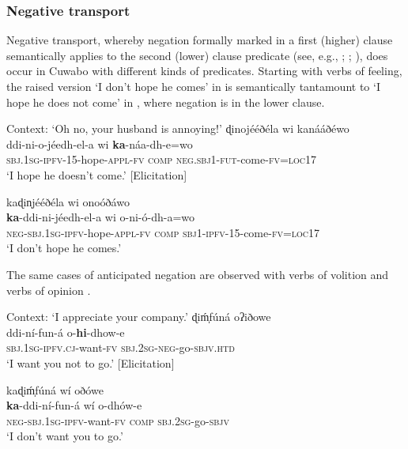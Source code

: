 \documentclass[output=paper,colorlinks=true, citecolor=brown,draftmode]{langscibook}
\begin{document}
\subsubsection{Negative transport}\label{sec:cuw:4.6.1}
Negative transport, whereby negation formally marked in a first (higher) clause semantically applies to the second (lower) clause predicate (see, e.g., \citealt{Lakoff1969}; \citealt{Lindholm1969}; \citealt{Horn1989}), does occur in Cuwabo with different kinds of predicates. Starting with verbs of feeling, the raised version ‘I don’t hope he comes’ in  is semantically tantamount to ‘I hope he does not come’ in , where negation is in the lower clause.

\ea\label{ex:cuw:81}
    Context:  ‘Oh no, your husband is annoying!’ %
    \ea\label{ex:cuw:81a} ɖinojééðéla wi kanááðéwo\\ 
        \gll  ddi-ni-o-jéedh-el-a wi \textbf{ka}{}-náa-dh-e=wo \\
               \textsc{sbj.1sg-ipfv-15}{}-hope-\textsc{appl-fv} \textsc{comp} \textsc{neg.sbj1-fut-}come-\textsc{fv=loc17} \\
        \glt  ‘I hope he doesn’t come.’ [Elicitation]

    \ex\label{ex:cuw:81b} kaɖin̩jééðéla wi onoóðáwo \\
        \gll  \textbf{ka}{}-ddi-ni-jéedh-el-a wi o-ni-ó-dh-a=wo \\
             \textsc{neg-sbj.1sg-ipfv-}hope-\textsc{appl-fv} \textsc{comp} \textsc{sbj1-ipfv-15-}come-\textsc{fv}\textsc{=loc17}  \\
        \glt  ‘I don’t hope he comes.’
    \z
\z 

The same cases of anticipated negation are observed with verbs of volition  and verbs of opinion .
\newpage
{\ea\label{ex:cuw:82}
    Context:  ‘I appreciate your company.’ %
    \ea\label{ex:cuw:82a} ɖiḿ̩fúná oʔiðowe\\ 
        \gll  ddi-ní-fun-á o-\textbf{hi}{}-dhow-e \\
              \textsc{sbj.1sg-ipfv.cj}{}-want-\textsc{fv} \textsc{sbj.2sg-neg}{}-go-\textsc{sbjv.htd} \\
        \glt  ‘I want you not to go.’ [Elicitation]

    \ex\label{ex:cuw:82b} kaɖiḿ̩fúná wí oðówe\\
        \gll  \textbf{ka}{}-ddi-ní-fun-á wí o-dhów-e\\
               \textsc{neg-sbj.1sg-ipfv}{}-want-\textsc{fv} \textsc{comp} \textsc{sbj.2sg-}go-\textsc{sbjv}\\
        \glt  ‘I don’t want you to go.’ 
    \z
\z }
\end{document}

